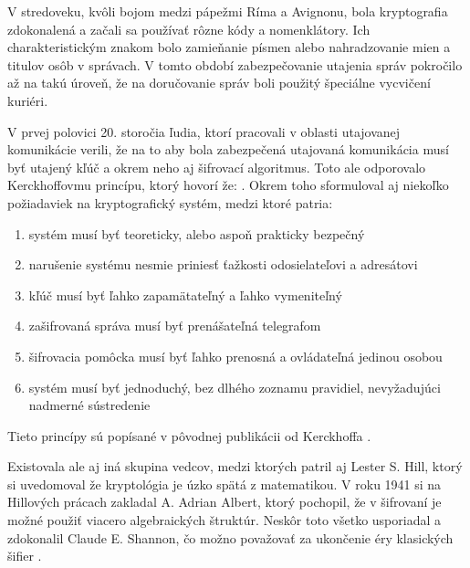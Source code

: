 V stredoveku, kvôli bojom medzi pápežmi Ríma a Avignonu, bola kryptografia zdokonalená a začali sa používať rôzne kódy a nomenklátory.
Ich charakteristickým znakom bolo zamieňanie písmen alebo nahradzovanie mien a titulov osôb v správach.
V tomto období zabezpečovanie utajenia správ pokročilo až na takú úroveň, že na doručovanie správ boli použitý špeciálne vycvičení kuriéri.

V prvej polovici 20. storočia ľudia, ktorí pracovali v oblasti utajovanej komunikácie verili, že na to aby bola zabezpečená utajovaná komunikácia musí byť utajený kľúč a okrem neho aj šifrovací algoritmus. Toto ale odporovalo Kerckhoffovmu princípu, ktorý hovorí že: . Okrem toho sformuloval aj niekoľko požiadaviek na kryptografický systém, medzi ktoré patria:
\begin{enumerate}
\item systém musí byť teoreticky, alebo aspoň prakticky bezpečný
\item narušenie systému nesmie priniesť ťažkosti odosielateľovi a adresátovi
\item kľúč musí byť ľahko zapamätateľný a ľahko vymeniteľný
\item zašifrovaná správa musí byť prenášateľná telegrafom
\item šifrovacia pomôcka musí byť ľahko prenosná a ovládateľná jedinou osobou
\item systém musí byť jednoduchý, bez dlhého zoznamu pravidiel, nevyžadujúci nadmerné sústredenie
\end{enumerate}
Tieto princípy sú popísané v pôvodnej publikácii od Kerckhoffa \cite{kerckhoff}.

Existovala ale aj iná skupina vedcov, medzi ktorých patril aj Lester S. Hill, ktorý si uvedomoval že kryptológia je úzko spätá z matematikou.
V roku 1941 si na Hillových prácach zakladal A. Adrian Albert, ktorý pochopil, že v šifrovaní je možné použiť viacero algebraických štruktúr.
Neskôr toto všetko usporiadal a zdokonalil Claude E. Shannon, čo možno považovať za ukončenie éry klasických šifier \cite{ks}.


